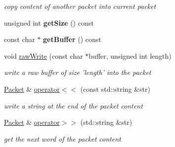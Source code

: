 \begin{DoxyCompactItemize}
\begin{DoxyCompactList}\small\item\em copy content of another packet into current packet \end{DoxyCompactList}\item 
\hypertarget{class_f_t_p_1_1_packet_ab67e5329d916ca745500c5cc0942a3f1}{unsigned int {\bfseries get\-Size} () const }\label{class_f_t_p_1_1_packet_ab67e5329d916ca745500c5cc0942a3f1}

\item 
\hypertarget{class_f_t_p_1_1_packet_af141e6f529ed3230e562ee3f3340fbcb}{const char $\ast$ {\bfseries get\-Buffer} () const }\label{class_f_t_p_1_1_packet_af141e6f529ed3230e562ee3f3340fbcb}

\item 
\hypertarget{class_f_t_p_1_1_packet_a579ab0ada8b4adbd2685cd6a8389c05a}{void \hyperlink{class_f_t_p_1_1_packet_a579ab0ada8b4adbd2685cd6a8389c05a}{raw\-Write} (const char $\ast$buffer, unsigned int length)}\label{class_f_t_p_1_1_packet_a579ab0ada8b4adbd2685cd6a8389c05a}

\begin{DoxyCompactList}\small\item\em write a raw buffer of size 'length' into the packet \end{DoxyCompactList}\item 
\hypertarget{class_f_t_p_1_1_packet_af3ce1782e8b128d3c5e29cb42ca00f97}{\hyperlink{class_f_t_p_1_1_packet}{Packet} \& \hyperlink{class_f_t_p_1_1_packet_af3ce1782e8b128d3c5e29cb42ca00f97}{operator$<$$<$} (const std\-::string \&str)}\label{class_f_t_p_1_1_packet_af3ce1782e8b128d3c5e29cb42ca00f97}

\begin{DoxyCompactList}\small\item\em write a string at the end of the packet content \end{DoxyCompactList}\item 
\hypertarget{class_f_t_p_1_1_packet_ad8407d95fda0ff5febf2ceb8fdbf67fe}{\hyperlink{class_f_t_p_1_1_packet}{Packet} \& \hyperlink{class_f_t_p_1_1_packet_ad8407d95fda0ff5febf2ceb8fdbf67fe}{operator$>$$>$} (std\-::string \&str)}\label{class_f_t_p_1_1_packet_ad8407d95fda0ff5febf2ceb8fdbf67fe}

\begin{DoxyCompactList}\small\item\em get the next word of the packet content \end{DoxyCompactList}\end{DoxyCompactItemize}
